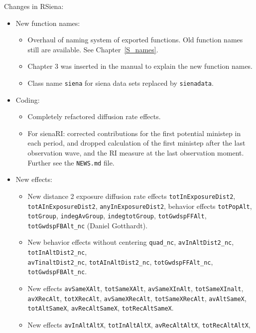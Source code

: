 \documentclass[a4paper,fleqn,11pt]{article}
\newcommand{\+}{\, + \,}
\newcommand{\sfn}[1]{\textsf{#1}}
\begin{document}
\begin{small}
\begin{itemize}
Changes in RSiena:
\begin{itemize}
\item New function names:
   \begin{itemize}
   \item Overhaul of naming system of exported functions.
        Old function names still are available.
        See Chapter~\ref{S_names}.
   \item Chapter 3 was inserted in the manual to explain
    the new function names.
   \item Class name \texttt{siena} for siena data sets
     replaced by \texttt{sienadata}.
    \end{itemize}
\item Coding:
   \begin{itemize}
    \item Completely refactored diffusion rate effects.
    \item For \sfn {sienaRI}: corrected contributions for the
    first potential ministep in each period, and dropped calculation of the
    first ministep after the last observation wave, and the
    RI measure at the last observation moment. \\
    Further see the \texttt{NEWS.md} file.
    \end{itemize}
\item New effects:
   \begin{itemize}
  \item New distance 2 exposure diffusion rate effects \texttt{totInExposureDist2},
  \texttt{totAInExposureDist2}, \texttt{anyInExposureDist2},
  behavior effects \texttt{totPopAlt},
  \texttt{totGroup}, \texttt{indegAvGroup}, \texttt{indegtotGroup},
  \texttt{totGwdspFFAlt}, \texttt{totGwdspFBAlt\_nc} (Daniel Gotthardt).
  \item New behavior effects without centering \texttt{quad\_nc},
  \texttt{avInAltDist2\_nc}, \texttt{totInAltDist2\_nc}, \\
  \texttt{avTinaltDist2\_nc}, \texttt{totAInAltDist2\_nc},
  \texttt{totGwdspFFAlt\_nc}, \texttt{totGwdspFBAlt\_nc}.
 \item New effects \texttt{avSameXAlt}, \texttt{totSameXAlt},
 \texttt{avSameXInAlt}, \texttt{totSameXInalt},
  \texttt{avXRecAlt}, \texttt{totXRecAlt}, \texttt{avSameXRecAlt},
  \texttt{totSameXRecAlt},
  \texttt{avAltSameX}, \texttt{totAltSameX}, \texttt{avRecAltSameX},
  \texttt{totRecAltSameX}.
  \item New effects \texttt{avInAltAltX}, \texttt{totInAltAltX},
  \texttt{avRecAltAltX}, \texttt{totRecAltAltX},

\end{itemize}
\end{itemize}
\end{itemize}
\end{small}
\end{document}
